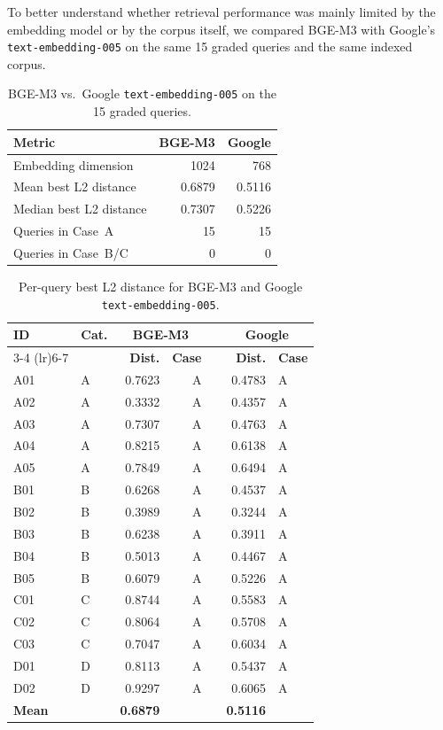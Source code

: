 To better understand whether retrieval performance was mainly limited by the
embedding model or by the corpus itself, we compared BGE-M3 with Google's
\texttt{text-embedding-005} on the same 15 graded queries and the same
indexed corpus.

\begin{table}[H]
\centering
\caption{BGE-M3 vs.\ Google \texttt{text-embedding-005} on the 15 graded queries.}
\label{tab:embedding-aggregate}
\begin{tabular}{lrr}
\toprule
\textbf{Metric} & \textbf{BGE-M3} & \textbf{Google} \\
\midrule
Embedding dimension      & 1024 & 768 \\
Mean best L2 distance    & 0.6879 & 0.5116 \\
Median best L2 distance  & 0.7307 & 0.5226 \\
Queries in Case~A        & 15 & 15 \\
Queries in Case~B/C      & 0 & 0 \\
\bottomrule
\end{tabular}
\end{table}

\begin{table}[H]
\centering
\caption{Per-query best L2 distance for BGE-M3 and Google \texttt{text-embedding-005}.}
\label{tab:embedding-per-query}
\begin{tabular}{llrrlrl}
\toprule
\textbf{ID} & \textbf{Cat.} & \multicolumn{2}{c}{\textbf{BGE-M3}} & &
\multicolumn{2}{c}{\textbf{Google}} \\
\cmidrule(lr){3-4} \cmidrule(lr){6-7}
& & \textbf{Dist.} & \textbf{Case} & & \textbf{Dist.} & \textbf{Case} \\
\midrule
A01 & A & 0.7623 & A & & 0.4783 & A \\
A02 & A & 0.3332 & A & & 0.4357 & A \\
A03 & A & 0.7307 & A & & 0.4763 & A \\
A04 & A & 0.8215 & A & & 0.6138 & A \\
A05 & A & 0.7849 & A & & 0.6494 & A \\
B01 & B & 0.6268 & A & & 0.4537 & A \\
B02 & B & 0.3989 & A & & 0.3244 & A \\
B03 & B & 0.6238 & A & & 0.3911 & A \\
B04 & B & 0.5013 & A & & 0.4467 & A \\
B05 & B & 0.6079 & A & & 0.5226 & A \\
C01 & C & 0.8744 & A & & 0.5583 & A \\
C02 & C & 0.8064 & A & & 0.5708 & A \\
C03 & C & 0.7047 & A & & 0.6034 & A \\
D01 & D & 0.8113 & A & & 0.5437 & A \\
D02 & D & 0.9297 & A & & 0.6065 & A \\
\midrule
\textbf{Mean} & & \textbf{0.6879} & & & \textbf{0.5116} & \\
\bottomrule
\end{tabular}
\end{table}

